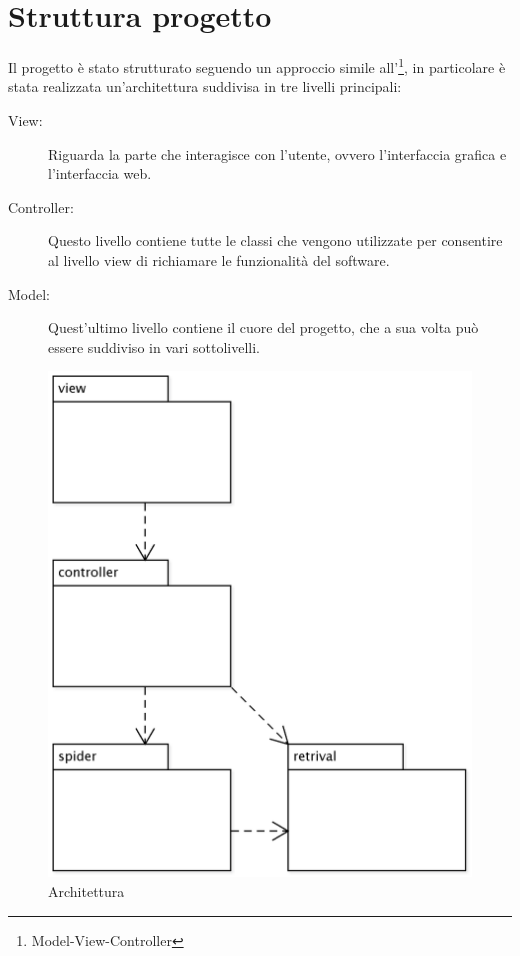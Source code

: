 \chapter{Struttura progetto}\label{cap:struttura}
Il progetto è stato strutturato seguendo un approccio simile all'\footnote{Model-View-Controller}, in particolare è stata realizzata un'architettura suddivisa in tre livelli principali:
\begin{description}
\item[View:] Riguarda la parte che interagisce con l'utente, ovvero l'interfaccia grafica e l'interfaccia web.
\item[Controller:] Questo livello contiene tutte le classi che vengono utilizzate per consentire al livello view di richiamare le funzionalità del software.
\item[Model:] Quest'ultimo livello contiene il cuore del progetto, che a sua volta può essere suddiviso in vari sottolivelli.
\end{description}
\begin{figure}[htb]
\begin{center}
\includegraphics[scale=0.10]{etc/architettura.png}
\caption{Architettura}
\label{architettura}
\end{center}
\end{figure}
